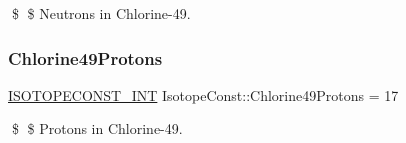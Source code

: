 \$ \$ Neutrons in Chlorine-\/49. \mbox{\label{group___isotope_const-_chlorine-_cl49_ga52639bbae4e482c1dc7b14a6a44a6d2b}} 
\subsubsection{\texorpdfstring{Chlorine49\+Protons}{Chlorine49Protons}}
{\footnotesize\ttfamily \mbox{\hyperlink{group___isotope_const-_macros_ga5f18360b3e99483a35c32d789e62621c}{I\+S\+O\+T\+O\+P\+E\+C\+O\+N\+S\+T\+\_\+\+I\+NT}} Isotope\+Const\+::\+Chlorine49\+Protons = 17}

\$ \$ Protons in Chlorine-\/49. 